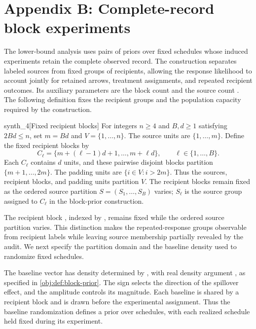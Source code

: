 \section{Appendix B: Complete-record block experiments}

The lower-bound analysis uses pairs of priors over fixed schedules whose induced experiments retain the complete observed record. The construction separates labeled sources from fixed groups of recipients, allowing the response likelihood to account jointly for retained arrows, treatment assignments, and repeated recipient outcomes. Its auxiliary parameters are the block count  and the source count . The following definition fixes the recipient groups and the population capacity required by the construction.

\begin{definitionv}{synth_4}[Fixed recipient blocks]
For integers \(n\ge4\) and \(B,d\ge1\) satisfying \(2Bd\le n\), set \(m=Bd\) and \(V=\{1,\ldots,n\}\). The source units are \(\{1,\ldots,m\}\). Define the fixed recipient blocks by
\[
C_\ell=\{m+(\ell-1)d+1,\ldots,m+\ell d\},
\qquad \ell\in\{1,\ldots,B\}.
\]
Each \(C_\ell\) contains \(d\) units, and these pairwise disjoint blocks partition \(\{m+1,\ldots,2m\}\). The padding units are \(\{i\in V:i>2m\}\). Thus the sources, recipient blocks, and padding units partition \(V\). The recipient blocks remain fixed as the ordered source partition \(S=(S_1,\ldots,S_B)\) varies; \(S_\ell\) is the source group assigned to \(C_\ell\) in the block-prior construction.
\end{definitionv}

The recipient block , indexed by , remains fixed while the ordered source partition  varies. This distinction makes the repeated-response groups observable from recipient labels while leaving source membership partially revealed by the audit. We next specify the partition domain and the baseline density used to randomize fixed schedules.



The baseline vector  has density determined by , with real density argument , as specified in \cref{obj:def:block-prior}. The sign  selects the direction of the spillover effect, and the amplitude  controls its magnitude. Each baseline is shared by a recipient block and is drawn before the experimental assignment. Thus the baseline randomization defines a prior over schedules, with each realized schedule held fixed during its experiment.

